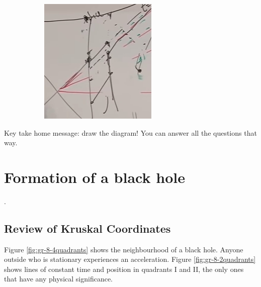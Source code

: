 \documentclass[]{article}
\begin{document}
{\begin{figure}[H]
\begin{subfigure}[t]{0.3\textwidth}
		\includegraphics[width=\textwidth]{gr-7-accelerating-charlie}
	\end{subfigure}
\end{figure}

Key take home message: draw the diagram! You can answer all the questions that way.

\section{Formation of a black hole}.

\subsection{Review of Kruskal Coordinates}

Figure \ref{fig:gr-8-4quadrants} shows the neighbourhood of a black hole. Anyone outside who is stationary experiences an acceleration. Figure \ref{fig:gr-8-2quadrants} shows lines of constant time and position in quadrants I and II, the only ones that have any physical significance.


}
\end{document}
